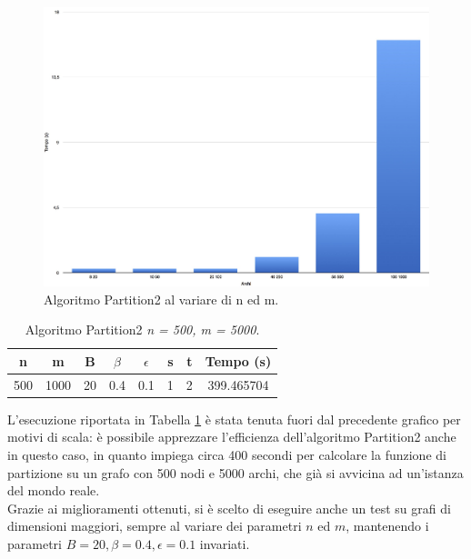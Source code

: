 \begin{figure}[h!]
	\vspace*{1cm}
	\centering
	\includegraphics[scale=.15]{img/scala.jpg}
	\caption{Algoritmo Partition2 al variare di n ed m.}
\end{figure}
\begin{table}[]
	\centering
	\begin{tabular}{|c|c|c|c|c|c|c|c|}
		\hline
		n & m & B & $\beta$ & $\epsilon$ & s & t & Tempo (s)\\ \hline
		500 & 1000 & 20 & 0.4 & 0.1 & 1 & 2 & 399.465704\\ \hline
	\end{tabular}
	\caption{Algoritmo Partition2 \textit{n = 500, m = 5000}.}\label{tab:5000}
\end{table}
L'esecuzione riportata in Tabella \ref{tab:5000} è stata tenuta fuori dal precedente grafico per motivi di scala: è possibile apprezzare l'efficienza dell'algoritmo Partition2 anche in questo caso, in quanto impiega circa 400 secondi per calcolare la funzione di partizione su un grafo con 500 nodi e 5000 archi, che già si avvicina ad un'istanza del mondo reale.\\
Grazie ai miglioramenti ottenuti, si è scelto di eseguire anche un test su grafi di dimensioni maggiori, sempre al variare dei parametri $n$ ed $m$, mantenendo i parametri $B = 20, \beta = 0.4, \epsilon = 0.1$ invariati.
